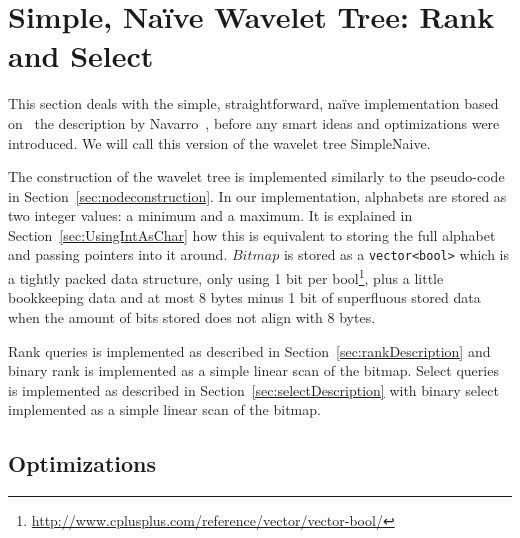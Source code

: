 \section{Simple, Naïve Wavelet Tree: Rank and Select}
This section deals with the simple, straightforward, naïve implementation based on ~the description by Navarro~, before any smart ideas and optimizations were introduced.
We will call this version of the wavelet tree SimpleNaive.

The construction of the wavelet tree is implemented similarly to the pseudo-code in Section~\ref{sec:nodeconstruction}.
In our implementation, alphabets are stored as two integer values: a minimum and a maximum.
It is explained in Section~\ref{sec:UsingIntAsChar} how this is equivalent to storing the full alphabet and passing pointers into it around.
$Bitmap$ is stored as a \texttt{vector<bool>} which is a tightly packed data structure, only using 1 bit per bool\footnote{\url{http://www.cplusplus.com/reference/vector/vector-bool/}}, plus a little bookkeeping data and at most 8 bytes minus 1 bit of superfluous stored data when the amount of bits stored does not align with 8 bytes.

Rank queries is implemented as described in Section~\ref{sec:rankDescription} and
binary rank is implemented as a simple linear scan of the bitmap.
Select queries is implemented as described in Section~\ref{sec:selectDescription} with binary select implemented as a simple linear scan of the bitmap.

\subsection{Optimizations}
\label{sec:simpleoptimizations}
